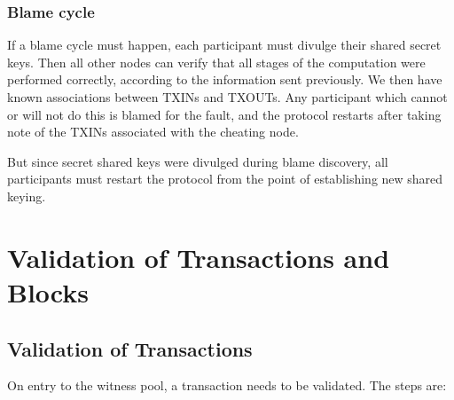 \documentclass[a4paper, 10pt, conference]{ieeeconf}
\begin{document}
\subsubsection{Blame cycle} If a blame cycle must happen, each participant must divulge their shared secret keys. Then all other nodes can verify that all stages of the computation were performed correctly, according to the information sent previously. We then have known associations between TXINs and TXOUTs. Any participant which cannot or will not do this is blamed for the fault, and the protocol restarts after taking note of the TXINs associated with the cheating node.

But since secret shared keys were divulged during blame discovery, all participants must restart the protocol from the point of establishing new shared keying.

\section{Validation of Transactions and Blocks}\label{tx_processing}

\subsection{Validation of Transactions}
On entry to the witness pool, a transaction needs to be validated. The steps are:
\end{document}
